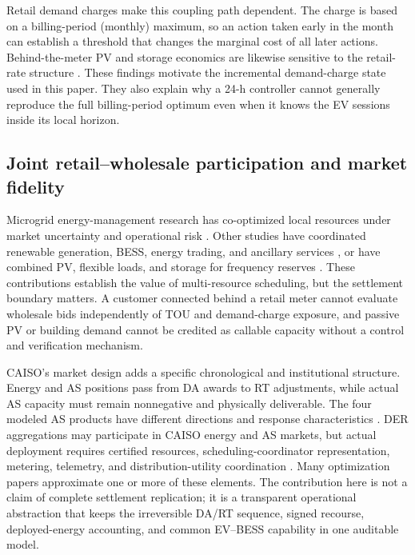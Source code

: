 \documentclass[final,5p,times]{elsarticle}
\begin{document}
Retail demand charges make this coupling path dependent. The charge is based on a billing-period (monthly) maximum, so an action taken early in the month can establish a threshold that changes the marginal cost of all later actions. Behind-the-meter PV and storage economics are likewise sensitive to the retail-rate structure \cite{boampong2020retail}. These findings motivate the incremental demand-charge state used in this paper. They also explain why a 24-h controller cannot generally reproduce the full billing-period optimum even when it knows the EV sessions inside its local horizon.

\subsection{Joint retail--wholesale participation and market fidelity}
Microgrid energy-management research has co-optimized local resources under market uncertainty and operational risk \cite{parisio2014model} \cite{shen2016microgrid} \cite{hasankhani2021stochastic}. Other studies have coordinated renewable generation, BESS, energy trading, and ancillary services \cite{santosuosso2024sempc}, or have combined PV, flexible loads, and storage for frequency reserves \cite{warmerdam2026power}. These contributions establish the value of multi-resource scheduling, but the settlement boundary matters. A customer connected behind a retail meter cannot evaluate wholesale bids independently of TOU and demand-charge exposure, and passive PV or building demand cannot be credited as callable capacity without a control and verification mechanism.

CAISO's market design adds a specific chronological and institutional structure. Energy and AS positions pass from DA awards to RT adjustments, while actual AS capacity must remain nonnegative and physically deliverable. The four modeled AS products have different directions and response characteristics \cite{caisoAncillary2026}. DER aggregations may participate in CAISO energy and AS markets, but actual deployment requires certified resources, scheduling-coordinator representation, metering, telemetry, and distribution-utility coordination \cite{caisoDER2026}. Many optimization papers approximate one or more of these elements. The contribution here is not a claim of complete settlement replication; it is a transparent operational abstraction that keeps the irreversible DA/RT sequence, signed recourse, deployed-energy accounting, and common EV--BESS capability in one auditable model.
\end{document}
